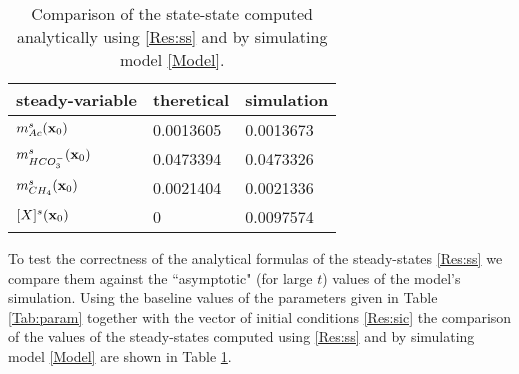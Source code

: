 \documentclass[a4paper, 12pt]{article}
\begin{document}
\smallskip

\begin{table}[t!]
\begin{center}
\begin{tabular}{l|l|l}
steady-variable 				&theretical 	& simulation\\
\hline
$m^{s}_{Ac}(\mathbf{x}_0)$ 			&0.0013605	& 0.0013673\\
$m^{s}_{HCO_3^-}(\mathbf{x}_0)$ 		&0.0473394	& 0.0473326\\
$m^{s}_{CH_4}(\mathbf{x}_0)$			&0.0021404	& 0.0021336\\
$[X]^{s}(\mathbf{x}_0) $				&0			& 0.0097574\\
\hline
\end{tabular}
\caption{Comparison of the state-state computed analytically using \eqref{Res:ss} and by simulating model \eqref{Model}.}\label{Fig:sscomp}
\end{center}
\end{table}

To test the correctness of the analytical formulas  of the steady-states \eqref{Res:ss} we compare them against the ``asymptotic" (for large $t$) values of the model's simulation. Using the baseline values of the parameters given in Table \ref{Tab:param} together with the vector of initial conditions  \eqref{Res:sic} the comparison of the values of the steady-states  computed using \eqref{Res:ss} and by simulating model \eqref{Model} are shown in Table \ref{Fig:sscomp}.

%
%
%



\end{document}
